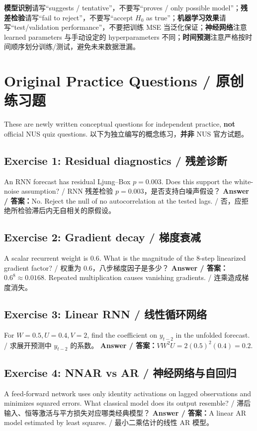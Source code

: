 \documentclass[UTF8,fontset=fandol,10.5pt,a4paper]{ctexart}
\begin{document}
\begin{pitbox}[title={阅卷视角：这些表述能避免失分}]
\textbf{模型识别}请写“suggests / tentative”，不要写“proves / only possible model”；\textbf{残差检验}请写“fail to reject”，不要写“accept $H_0$ as true”；\textbf{机器学习效果}请写“test/validation performance”，不要把训练 MSE 当泛化保证；\textbf{神经网络}注意 learned parameters 与手动设定的 hyperparameters 不同；\textbf{时间预测}注意严格按时间顺序划分训练/测试，避免未来数据泄漏。
\end{pitbox}

\clearpage
\section{Original Practice Questions / 原创练习题}
\begin{keybox}[title={Independent exercises / 独立编写练习}]
These are newly written conceptual questions for independent practice, \textbf{not} official NUS quiz questions. 以下为独立编写的概念练习，\textbf{并非} NUS 官方试题。
\end{keybox}
\subsection*{Exercise 1: Residual diagnostics / 残差诊断}
An RNN forecast has residual Ljung--Box $p=0.003$. Does this support the white-noise assumption? / RNN 残差检验 $p=0.003$，是否支持白噪声假设？
\textbf{Answer / 答案：}No. Reject the null of no autocorrelation at the tested lags. / 否，应拒绝所检验滞后内无自相关的原假设。
\subsection*{Exercise 2: Gradient decay / 梯度衰减}
A scalar recurrent weight is $0.6$. What is the magnitude of the 8-step linearized gradient factor? / 权重为 $0.6$，八步梯度因子是多少？
\textbf{Answer / 答案：}$0.6^8\approx 0.0168$. Repeated multiplication causes vanishing gradients. / 连乘造成梯度消失。
\subsection*{Exercise 3: Linear RNN / 线性循环网络}
For $W=0.5,U=0.4,V=2$, find the coefficient on $y_{t-2}$ in the unfolded forecast. / 求展开预测中 $y_{t-2}$ 的系数。
\textbf{Answer / 答案：}$VW^2U=2(0.5)^2(0.4)=0.2$.
\subsection*{Exercise 4: NNAR vs AR / 神经网络与自回归}
A feed-forward network uses only identity activations on lagged observations and minimizes squared errors. What classical model does its output resemble? / 滞后输入、恒等激活与平方损失对应哪类经典模型？
\textbf{Answer / 答案：}A linear AR model estimated by least squares. / 最小二乘估计的线性 AR 模型。
\end{document}

